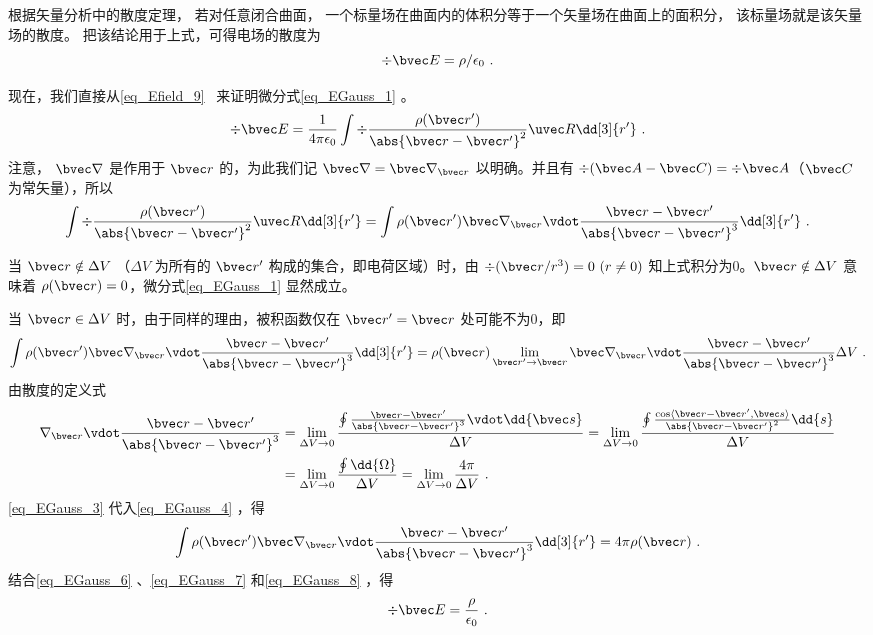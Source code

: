 根据矢量分析中的散度定理， 若对任意闭合曲面， 一个标量场在曲面内的体积分等于一个矢量场在曲面上的面积分， 该标量场就是该矢量场的散度。 把该结论用于上式，可得电场的散度为
\begin{equation}
\div \bvec E = \rho / \epsilon_0~.
\end{equation}

现在，我们直接从\autoref{eq_Efield_9}~ 来证明微分式\autoref{eq_EGauss_1} 。
\begin{equation}\label{eq_EGauss_6}
\div \bvec E=\frac{1}{4\pi\epsilon_0}\int\div\frac{\rho(\bvec r')}{\abs{\bvec r-\bvec r'}^2}\uvec R\dd[3]{r'}~.
\end{equation}
注意， $\bvec\nabla$ 是作用于 $\bvec r$ 的，为此我们记 $\bvec\nabla=\bvec\nabla_{\bvec r}$ 以明确。并且有 $\div (\bvec A-\bvec C)=\div \bvec A$（$\bvec C$ 为常矢量），所以
\begin{equation}\label{eq_EGauss_7}
\int\div\frac{\rho(\bvec r')}{\abs{\bvec r-\bvec r'}^2}\uvec R\dd[3]{r'}=\int\rho(\bvec r')\bvec\nabla_{\bvec r}\vdot\frac{\bvec r-\bvec r'}{\abs{\bvec r-\bvec r'}^3}\dd[3]{r'}~.
\end{equation}

当 $\bvec r\notin \Delta V$ （$\Delta V$ 为所有的 $\bvec r'$ 构成的集合，即电荷区域）时，由 $\div (\bvec r/r^3)=0\,\,(r\neq 0)$ 知上式积分为0。$\bvec r\notin \Delta V$ 意味着 $\rho(\bvec r)=0$，微分式\autoref{eq_EGauss_1} 显然成立。

当 $\bvec r\in \Delta V$ 时，由于同样的理由，被积函数仅在 $\bvec r'=\bvec r$ 处可能不为0，即
\begin{equation}\label{eq_EGauss_4}
\int\rho(\bvec r')\bvec\nabla_{\bvec r}\vdot\frac{\bvec r-\bvec r'}{\abs{\bvec r-\bvec r'}^3}\dd[3]{r'}=\rho(\bvec r)\lim_{\bvec r'\rightarrow\bvec r}\bvec\nabla_{\bvec r}\vdot\frac{\bvec r-\bvec r'}{\abs{\bvec r-\bvec r'}^3}\Delta V~.
\end{equation}
由散度的定义式
\begin{equation}\label{eq_EGauss_3}
\begin{aligned}
\nabla_{\bvec r}\vdot\frac{\bvec r-\bvec r'}{\abs{\bvec r-\bvec r'}^3}&=\lim_{\Delta V\rightarrow0}\frac{\oint\frac{\bvec r-\bvec r'}{\abs{\bvec r-\bvec r'}^3} \vdot\dd{\bvec s }}{\Delta V}=\lim_{\Delta V\rightarrow0}\frac{\oint\frac{\cos\langle\bvec r-\bvec r',\bvec s\rangle}{\abs{\bvec r-\bvec r'}^2} \dd{s }}{\Delta V}\\
&=\lim_{\Delta V\rightarrow0}\frac{\oint\dd{\Omega}}{\Delta V}=\lim_{\Delta V\rightarrow0}\frac{4\pi}{\Delta V}~.
\end{aligned}
\end{equation}
\autoref{eq_EGauss_3} 代入\autoref{eq_EGauss_4} ，得
\begin{equation}\label{eq_EGauss_8}
\int\rho(\bvec r')\bvec\nabla_{\bvec r}\vdot\frac{\bvec r-\bvec r'}{\abs{\bvec r-\bvec r'}^3}\dd[3]{r'}=4\pi\rho(\bvec r)~.
\end{equation}
结合\autoref{eq_EGauss_6} 、\autoref{eq_EGauss_7} 和\autoref{eq_EGauss_8} ，得
\begin{equation}
\div \bvec E=\frac{\rho}{\epsilon_0}~.
\end{equation}

